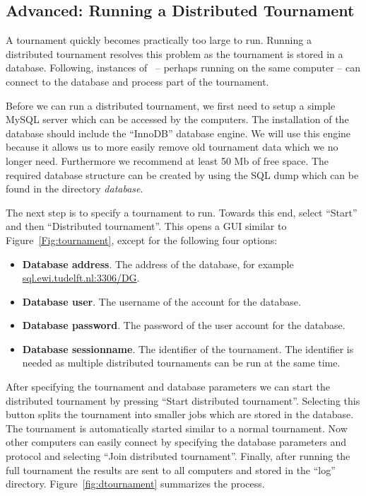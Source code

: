 \documentclass[]{article}
\begin{document}
\subsection{Advanced: Running a Distributed Tournament}
A tournament quickly becomes practically too large to run. Running a distributed tournament resolves this problem as the tournament is stored in a database. Following, instances of \Genius~-- perhaps running on the same computer -- can connect to the database and process part of the tournament.

Before we can run a distributed tournament, we first need to setup a simple MySQL server which can be accessed by the computers. The installation of the database should include the ``InnoDB'' database engine. We will use this engine because it allows us to more easily remove old tournament data which we no longer need. Furthermore we recommend at least 50 Mb of free space. The required database structure can be created by using the SQL dump which can be found in the directory \textit{database}.

The next step is to specify a tournament to run. Towards this end, select ``Start'' and then ``Distributed tournament''. This opens a GUI similar to Figure~\ref{Fig:tournament}, except for the following four options:

\begin{itemize}
	\item \textbf{Database address}. The address of the database, for example \url{sql.ewi.tudelft.nl:3306/DG}.
	\item \textbf{Database user}. The username of the account for the database.
	\item \textbf{Database password}. The password of the user account for the database.
	\item \textbf{Database sessionname}. The identifier of the tournament. The identifier is needed as multiple distributed tournaments can be run at the same time.
\end{itemize}

After specifying the tournament and database parameters we can start the distributed tournament by pressing ``Start distributed tournament''. Selecting this button splits the tournament into smaller jobs which are stored in the database. The tournament is automatically started similar to a normal tournament. Now other computers can easily connect by specifying the database parameters and protocol and selecting ``Join distributed tournament''. Finally, after running the full tournament the results are sent to all computers and stored in the ``log'' directory. Figure~\ref{fig:dtournament} summarizes the process.
\end{document}
